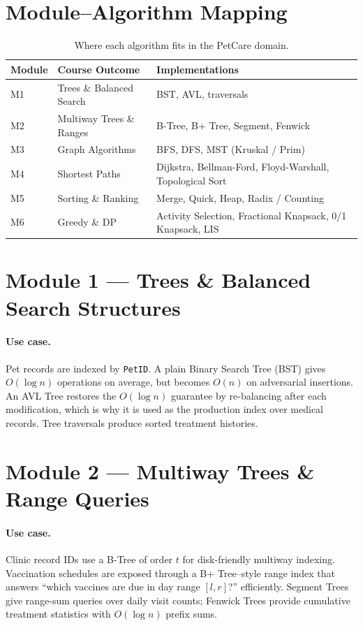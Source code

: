 \documentclass[11pt,a4paper]{article}
\begin{document}
\section{Module--Algorithm Mapping}
\begin{table}[h]
\centering
\begin{tabular}{@{}lll@{}}
\toprule
\textbf{Module} & \textbf{Course Outcome} & \textbf{Implementations} \\ \midrule
M1 & Trees \& Balanced Search    & BST, AVL, traversals \\
M2 & Multiway Trees \& Ranges    & B-Tree, B+ Tree, Segment, Fenwick \\
M3 & Graph Algorithms            & BFS, DFS, MST (Kruskal / Prim) \\
M4 & Shortest Paths              & Dijkstra, Bellman-Ford, Floyd-Warshall, Topological Sort \\
M5 & Sorting \& Ranking          & Merge, Quick, Heap, Radix / Counting \\
M6 & Greedy \& DP                & Activity Selection, Fractional Knapsack, 0/1 Knapsack, LIS \\ \bottomrule
\end{tabular}
\caption{Where each algorithm fits in the PetCare domain.}
\end{table}

\section{Module 1 --- Trees \& Balanced Search Structures}
\paragraph{Use case.} Pet records are indexed by \texttt{PetID}. A plain
Binary Search Tree (BST) gives \(O(\log n)\) operations on average, but
becomes \(O(n)\) on adversarial insertions. An AVL Tree restores the
\(O(\log n)\) guarantee by re-balancing after each modification, which is
why it is used as the production index over medical records. Tree
traversals produce sorted treatment histories.

\section{Module 2 --- Multiway Trees \& Range Queries}
\paragraph{Use case.} Clinic record IDs use a B-Tree of order \(t\) for
disk-friendly multiway indexing. Vaccination schedules are exposed through
a B+ Tree--style range index that answers ``which vaccines are due in day
range \([l,r]\)?'' efficiently. Segment Trees give range-sum queries over
daily visit counts; Fenwick Trees provide cumulative treatment statistics
with \(O(\log n)\) prefix sums.
\end{document}
